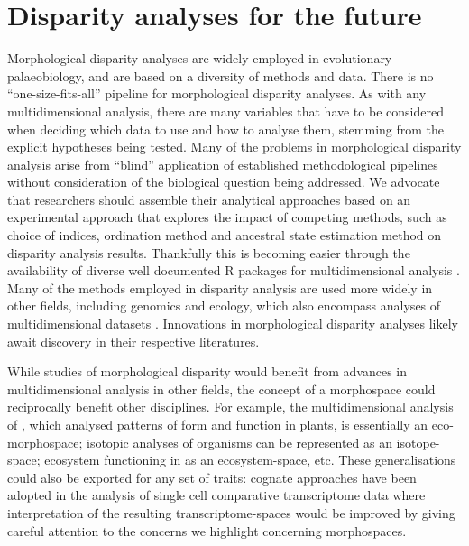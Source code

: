 \documentclass[12pt,letterpaper]{article}
\begin{document}
\section{Disparity analyses for the future} \label{section:future}

\noindent Morphological disparity analyses are widely employed in evolutionary palaeobiology, and are based on a diversity of methods and data.
There is no ``one-size-fits-all'' pipeline for morphological disparity analyses.
As with any multidimensional analysis, there are many variables that have to be considered when deciding which data to use and how to analyse them, stemming from the explicit hypotheses being tested.
Many of the problems in morphological disparity analysis arise from ``blind'' application of established methodological pipelines without consideration of the biological question being addressed.
We advocate that researchers should assemble their analytical approaches based on an experimental approach that explores the impact of competing methods, such as choice of indices, ordination method and ancestral state estimation method on disparity analysis results.
Thankfully this is becoming easier through the availability of diverse well documented R packages for multidimensional analysis \citep{Bouxin2005, oksanen2007vegan, Harmon2008, lloyd2016, Guillerme2018b}.
Many of the methods employed in disparity analysis are used more widely in other fields, including genomics and ecology, which also encompass analyses of multidimensional datasets \citep{Donohue2013, Saupe2015, Canter2018, mammola2019}.
Innovations in morphological disparity analyses likely await discovery in their respective literatures.

While studies of morphological disparity would benefit from advances in multidimensional analysis in other fields, the concept of a morphospace could reciprocally benefit other disciplines.
For example, the multidimensional analysis of \citep{Diaz2016}, which analysed patterns of form and function in plants, is essentially an eco-morphospace; isotopic analyses of organisms \citep{Jackson2011,Swanson2015} can be represented as an isotope-space; ecosystem functioning in \citealt{Donohue2013} as an ecosystem-space, etc.
These generalisations could also be exported for any set of traits: cognate approaches have been adopted in the analysis of single cell comparative transcriptome data \citep{Sebe-Pedros2018} where interpretation of the resulting transcriptome-spaces would be improved by giving careful attention to the concerns we highlight concerning morphospaces.
\end{document}
